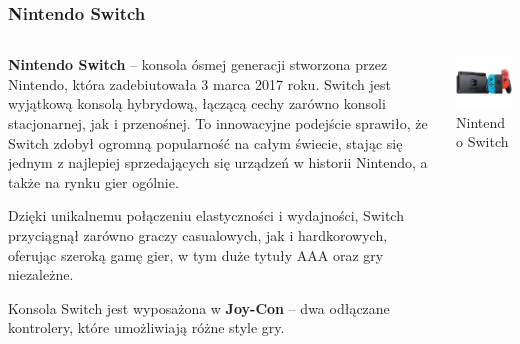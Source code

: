 \documentclass[8pt]{beamer}
\begin{document}
\begin{frame}
\frametitle{Nintendo Switch}
\begin{columns}

\begin{column}{0.6\textwidth}
\textbf {Nintendo Switch} –  konsola ósmej generacji stworzona przez Nintendo, która zadebiutowała 3 marca 2017 roku. Switch jest wyjątkową konsolą hybrydową, łączącą cechy zarówno konsoli stacjonarnej, jak i przenośnej. To innowacyjne podejście sprawiło, że Switch zdobył ogromną popularność na całym świecie, stając się jednym z najlepiej sprzedających się urządzeń w historii Nintendo, a także na rynku gier ogólnie. 

\vspace{0.5em} 
Dzięki unikalnemu połączeniu elastyczności i wydajności, Switch przyciągnął zarówno graczy casualowych, jak i hardkorowych, oferując szeroką gamę gier, w tym duże tytuły AAA oraz gry niezależne.

\vspace{0.5em}
Konsola Switch jest wyposażona w \textbf {Joy-Con} – dwa odłączane kontrolery, które umożliwiają różne style gry.

\end{column}

\begin{column}{0.35\textwidth}
        \centering
        \includegraphics[width=\textwidth]{nswitch.jpg} 
        {\small Nintendo Switch} 
    \end{column}
\end{columns}

\end{frame}
\end{document}
